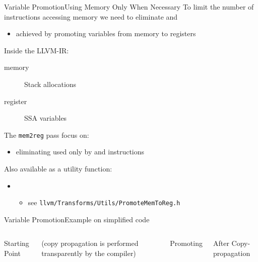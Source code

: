 \begin{frame}{Variable Promotion}{Using Memory Only When Necessary}
To limit the number of instructions accessing memory we need to eliminate  and 
\begin{itemize}
\item achieved by \alert{promoting} variables from memory to registers
\end{itemize}

\vfill
Inside the LLVM-IR:
\begin{description}
\item[memory] Stack allocations \\
\item[register] SSA variables \\
\end{description}

\vfill
The \texttt{mem2reg} pass focus on:
\begin{itemize}
\item eliminating  used only by  and
       instructions
\end{itemize}

Also available as a utility function:
\begin{itemize}
\item {}\\
\begin{itemize}
\item see \texttt{llvm/Transforms/Utils/PromoteMemToReg.h}
\end{itemize}
\end{itemize}
\end{frame}


\begin{frame}{Variable Promotion}{Example on simplified code}
\begin{columns}[t]
\begin{block}{Starting Point}
\end{block}

(copy propagation is performed transparently by the compiler)

\begin{block}{Promoting }
\end{block}

\begin{block}{After Copy-propagation}
\end{block}

\end{columns}
\end{frame}


